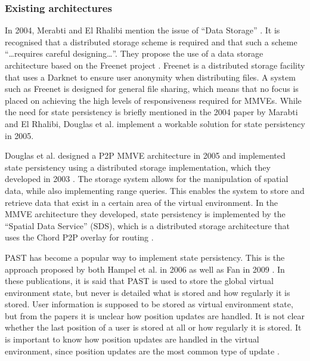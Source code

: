\subsubsection{Existing architectures}

In 2004, Merabti and El Rhalibi mention the issue of ``Data Storage'' \cite{using_freenet_storage}. It is recognised that a distributed storage scheme is required and that such a scheme ``\ldots requires careful designing\ldots''. They propose the use of a data storage architecture based on the Freenet project \cite{clarke_freenet}. Freenet is a distributed storage facility that uses a Darknet to ensure user anonymity when distributing files. A system such as Freenet is designed for general file sharing, which means that no focus is placed on achieving the high levels of responsiveness required for MMVEs. While the need for state persistency is briefly mentioned in the 2004 paper by Marabti and El Rhalibi, Douglas et
al. implement a workable solution for state persistency in 2005.

Douglas et al. designed a P2P MMVE architecture in 2005 \cite{Douglas05enablingmassively} and implemented state persistency using a distributed storage implementation, which they developed in 2003 \cite{Harwood03hashingspatial}. The storage system allows for the manipulation of spatial data, while also implementing range queries. This enables the system to store and retrieve data that exist in a certain area of the virtual environment. In the MMVE architecture they developed, state persistency is implemented by the ``Spatial Data Service'' (SDS), which is a distributed storage architecture that uses the Chord P2P overlay for routing \cite{chord}.

PAST has become a popular way to implement state persistency. This is the approach proposed by both Hampel et al. in 2006 \cite{past_storage_focus} as well as Fan in 2009 \cite{Fan_phd}. In these publications, it is said that PAST is used to store the global virtual environment state, but never is detailed what is stored and how regularly it is stored. User information is supposed to be stored as virtual environment state, but from the papers it is unclear how position updates are handled. It is not clear whether the last position of a user is stored at all or how regularly it is stored. It is important to know how position updates are handled in the virtual environment, since position updates are the most common type of update \cite{knutsson_p2p_first}.

